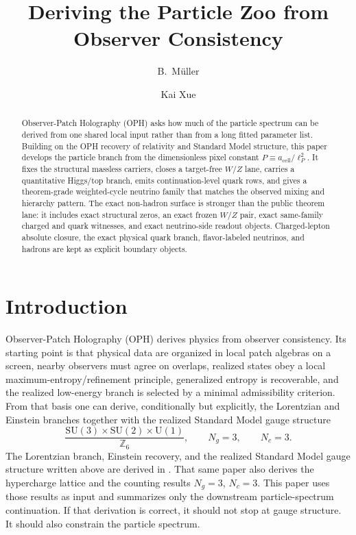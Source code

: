 \documentclass[11pt]{article}
\title{Deriving the Particle Zoo from\\
Observer Consistency}
\author{B.\ M\"uller \and Kai Xue}
\date{\OPHPaperReleaseDate}
\newcommand{\SU}{\mathrm{SU}}
\newcommand{\U}{\mathrm{U}}
\begin{document}
\maketitle
\OPHPaperReleaseBanner

\begin{abstract}
Observer-Patch Holography (OPH) asks how much of the particle spectrum can be derived from one shared local input rather than from a long fitted parameter list. Building on the OPH recovery of relativity and Standard Model structure, this paper develops the particle branch from the dimensionless pixel constant \(P \equiv a_{\mathrm{cell}}/\ell_P^2\). It fixes the structural massless carriers, closes a target-free \(W/Z\) lane, carries a quantitative Higgs/top branch, emits continuation-level quark rows, and gives a theorem-grade weighted-cycle neutrino family that matches the observed mixing and hierarchy pattern. The exact non-hadron surface is stronger than the public theorem lane: it includes exact structural zeros, an exact frozen \(W/Z\) pair, exact same-family charged and quark witnesses, and exact neutrino-side readout objects. Charged-lepton absolute closure, the exact physical quark branch, flavor-labeled neutrinos, and hadrons are kept as explicit boundary objects.
\end{abstract}

\section{Introduction}

Observer-Patch Holography (OPH) derives physics from observer consistency. Its
starting point is that physical data are organized in local patch algebras on a screen, nearby
observers must agree on overlaps, realized states obey a local maximum-entropy/refinement
principle, generalized entropy is recoverable, and the realized low-energy branch is selected by a
minimal admissibility criterion. From that basis one can derive, conditionally but explicitly, the
Lorentzian and Einstein branches together with the realized Standard Model gauge structure
\[
\frac{\SU(3)\times\SU(2)\times\U(1)}{\mathbb Z_6},
\qquad
N_g=3,
\qquad
N_c=3.
\]
The Lorentzian branch, Einstein recovery, and the realized Standard Model gauge structure written
above are derived in \cite{ophcompact}. That same paper also derives the hypercharge lattice and
the counting results \(N_g=3\), \(N_c=3\). This paper uses those results as input and summarizes only the
downstream particle-spectrum continuation. If that derivation is correct, it should not stop at gauge structure. It should also constrain the
particle spectrum.
\end{document}
